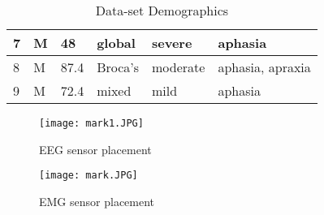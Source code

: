 \documentclass[letterpaper, 10 pt, conference]{ieeeconf}  %
\begin{document}
\begin{table}[!ht]
\begin{tabular}{|l|l|l|l|l|l|}
7           & M                                                               & 48                                                                  & global                                                          & severe            & aphasia                   \\ \hline
8           & M                                                               & 87.4                                                                & Broca's                                                         & moderate          & aphasia, apraxia          \\ \hline
9           & M                                                               & 72.4                                                                & mixed                                                           & mild              & aphasia                   \\ \hline
\end{tabular}
\caption{Data-set Demographics}
\end{table}


\begin{figure}[h]
\begin{center}
\texttt{[image: mark1.JPG]}
\caption{EEG sensor placement} 
\label{1vsall}
\end{center}
\end{figure}

\begin{figure}[h]
\begin{center}
\texttt{[image: mark.JPG]}
\caption{EMG sensor placement} 
\label{1vsall}
\end{center}
\end{figure}
\end{document}
